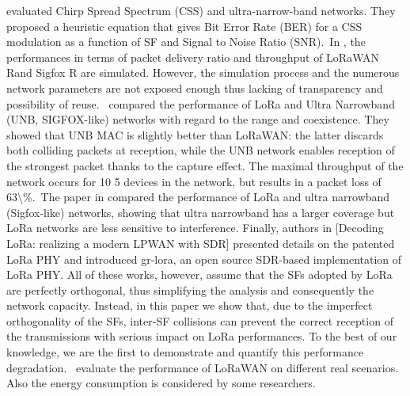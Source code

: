  \cite{reynders_range_2016}   \citet{reynders_range_2016} evaluated Chirp Spread Spectrum (CSS) and ultra-narrow-band networks. They proposed a heuristic equation that gives Bit Error Rate (BER) for a CSS modulation as a function of SF and Signal to Noise Ratio (SNR).~In \cite{reynders_range_2016}, the performances in terms of packet delivery ratio and throughput of LoRaWAN Rand Sigfox R are simulated. However, the simulation process and the numerous network parameters are not exposed enough thus lacking of transparency and possibility of reuse.~\citet{reynders_range_2016} compared the performance of LoRa and Ultra Narrowband (UNB, SIGFOX-like) networks with regard to the range and coexistence. They showed that UNB MAC is slightly better than LoRaWAN: the latter discards both colliding packets at reception, while the UNB network enables reception of the strongest packet thanks to the capture effect. The maximal throughput of the network occurs for 10 5 devices in the network, but results in a packet loss of 63\textbackslash\%.~The paper in \cite{reynders_range_2016} compared the performance of LoRa and ultra narrowband (Sigfox-like) networks, showing that ultra narrowband has a larger coverage but LoRa networks are less sensitive to interference. Finally, authors in [Decoding LoRa: realizing a modern LPWAN with SDR] presented details on the patented LoRa PHY and introduced gr-lora, an open source SDR-based implementation of LoRa PHY. All of these works, however, assume that the SFs adopted by LoRa are perfectly orthogonal, thus simplifying the analysis and consequently the network capacity. Instead, in this paper we show that, due to the imperfect orthogonality of the SFs, inter-SF collisions can prevent the correct reception of the transmissions with serious impact on LoRa performances. To the best of our knowledge, we are the first to demonstrate and quantify this performance degradation.~   \newline 
 \cite{sanchez-iborra_performance_2018}   \citet{sanchez-iborra_performance_2018} evaluate the performance of LoRaWAN on different real scenarios. Also the energy consumption is considered by some researchers.   \newline 
